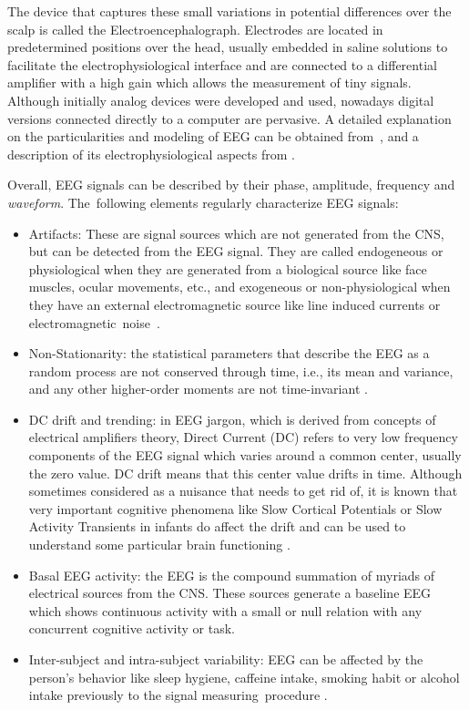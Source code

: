 \documentclass[brainsci,article,accept,moreauthors,pdftex,10pt,a4paper]{mdpi}
\begin{document}
The device that captures these small variations in potential differences over the scalp is called the Electroencephalograph.  Electrodes are located in predetermined positions over the head, usually embedded in saline solutions to facilitate the electrophysiological interface and are connected to a differential amplifier with a high gain which allows the measurement of tiny signals. Although initially analog devices were developed and used, nowadays digital versions connected directly to a computer are pervasive.  A detailed explanation on the particularities and modeling of EEG can be obtained from~\citep{Jackson2014}, and a description of its electrophysiological aspects from \citep{Haberman2012}.

Overall, EEG signals can be described by their phase, amplitude,  frequency and \textit{waveform}.  The~following elements regularly  characterize EEG signals:

\begin{itemize}[leftmargin=*,labelsep=5.8mm]
\item Artifacts:  These are signal sources which are not generated from the CNS, but can be detected from the EEG signal.  They are called endogeneous or physiological when they are generated from a biological source like face muscles, ocular movements, etc., and exogeneous or non-physiological when they have an external electromagnetic source like line induced currents or electromagnetic~noise~\citep{Weeda2012}.
\item Non-Stationarity: the statistical parameters that describe the EEG as a random process are not conserved through time, i.e., its mean and variance, and any other higher-order moments are not time-invariant \citep{Jansen1991}.
\item DC drift and trending: in EEG jargon, which is derived from concepts of electrical amplifiers theory, Direct Current (DC) refers to very low frequency components of the EEG signal which varies around a common center, usually the zero value.  DC drift means that this center value drifts in time.  Although sometimes considered as a nuisance that needs to get rid of, it is known that very important cognitive phenomena like Slow Cortical Potentials or Slow Activity Transients in infants do affect the drift and can be used to understand some particular brain functioning \cite{Schomer2010}.
\item Basal EEG activity: the EEG is the compound summation of myriads of electrical sources from the CNS.  These sources generate a baseline EEG which shows continuous activity with a small or null relation with any concurrent cognitive activity or task.
\item Inter-subject and intra-subject variability: EEG can be affected by the person's behavior like sleep hygiene, caffeine intake, smoking habit or alcohol intake previously to the signal measuring~procedure \citep{Farzan2017}.
\end{itemize}
\end{document}
